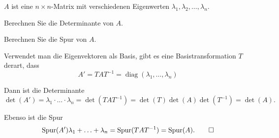 $A$ ist eine $n\times n$-Matrix mit verschiedenen Eigenwerten
$\lambda_1,\lambda_2,\dots,\lambda_n$.
\begin{teilaufgaben}
\item
Berechnen Sie die Determinante von $A$.
\item
Berechnen Sie die Spur von $A$.
\end{teilaufgaben}


\begin{loesung}
Verwendet man die Eigenvektoren als Basis, gibt es eine Basistransformation
$T$ derart, dass
\[
A'=TAT^{-1}=\operatorname{diag}(\lambda_1,\dots,\lambda_n)
\]
\begin{teilaufgaben}
\item
Dann ist die Determinante
\[
\det(A')
=
\lambda_1\cdot \ldots \cdot\lambda_n
=
\det(TAT^{-1})
=
\det(T)\det(A)\det(T^{-1})
=
\det(A).
\]
\item
Ebenso ist die Spur
\[
\operatorname{Spur}(A')
\lambda_1+ \ldots +\lambda_n
=
\operatorname{Spur}(TAT^{-1})
=
\operatorname{Spur}(A).
\qedhere
\]
\end{teilaufgaben}
\end{loesung}
